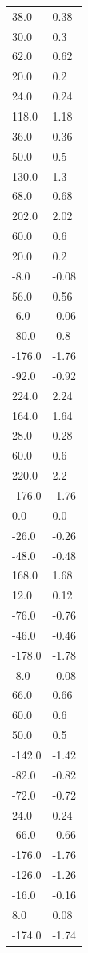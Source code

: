 \begin{longtable}{ll}
38.0 & 0.38 \\
30.0 & 0.3 \\
62.0 & 0.62 \\
20.0 & 0.2 \\
24.0 & 0.24 \\
118.0 & 1.18 \\
36.0 & 0.36 \\
50.0 & 0.5 \\
130.0 & 1.3 \\
68.0 & 0.68 \\
202.0 & 2.02 \\
60.0 & 0.6 \\
20.0 & 0.2 \\
-8.0 & -0.08 \\
56.0 & 0.56 \\
-6.0 & -0.06 \\
-80.0 & -0.8 \\
-176.0 & -1.76 \\
-92.0 & -0.92 \\
224.0 & 2.24 \\
164.0 & 1.64 \\
28.0 & 0.28 \\
60.0 & 0.6 \\
220.0 & 2.2 \\
-176.0 & -1.76 \\
0.0 & 0.0 \\
-26.0 & -0.26 \\
-48.0 & -0.48 \\
168.0 & 1.68 \\
12.0 & 0.12 \\
-76.0 & -0.76 \\
-46.0 & -0.46 \\
-178.0 & -1.78 \\
-8.0 & -0.08 \\
66.0 & 0.66 \\
60.0 & 0.6 \\
50.0 & 0.5 \\
-142.0 & -1.42 \\
-82.0 & -0.82 \\
-72.0 & -0.72 \\
24.0 & 0.24 \\
-66.0 & -0.66 \\
-176.0 & -1.76 \\
-126.0 & -1.26 \\
-16.0 & -0.16 \\
8.0 & 0.08 \\
-174.0 & -1.74 \\

\end{longtable}
